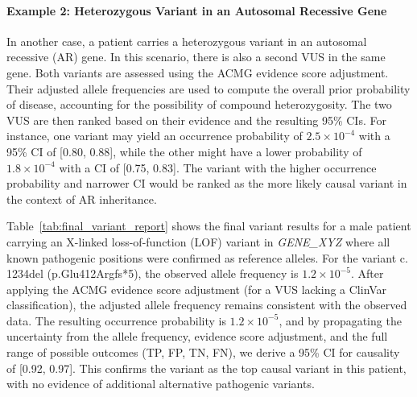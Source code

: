 \paragraph{Example 2: Heterozygous Variant in an Autosomal Recessive Gene}
In another case, a patient carries a heterozygous variant in an autosomal recessive (AR) gene. In this scenario, there is also a second VUS in the same gene. Both variants are assessed using the ACMG evidence score adjustment. Their adjusted allele frequencies are used to compute the overall prior probability of disease, accounting for the possibility of compound heterozygosity. The two VUS are then ranked based on their evidence and the resulting 95\% CIs. For instance, one variant may yield an occurrence probability of \(2.5\times10^{-4}\) with a 95\% CI of [0.80, 0.88], while the other might have a lower probability of \(1.8\times10^{-4}\) with a CI of [0.75, 0.83]. The variant with the higher occurrence probability and narrower CI would be ranked as the more likely causal variant in the context of AR inheritance.

Table~\ref{tab:final_variant_report} shows the final variant results for a male patient carrying an X-linked loss-of-function (LOF) variant in \textit{GENE\_XYZ} where all known pathogenic positions were confirmed as reference alleles. For the variant c.\,1234del (p.Glu412Argfs*5), the observed allele frequency is \(1.2\times10^{-5}\). After applying the ACMG evidence score adjustment (for a VUS lacking a ClinVar classification), the adjusted allele frequency remains consistent with the observed data. The resulting occurrence probability is \(1.2\times10^{-5}\), and by propagating the uncertainty from the allele frequency, evidence score adjustment, and the full range of possible outcomes (TP, FP, TN, FN), we derive a 95\% CI for causality of [0.92, 0.97]. This confirms the variant as the top causal variant in this patient, with no evidence of additional alternative pathogenic variants.

